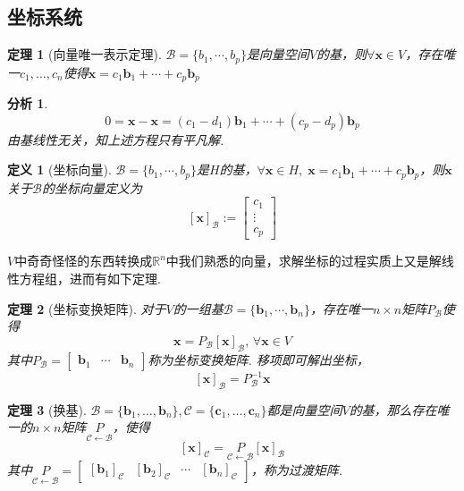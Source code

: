 \documentclass[11pt,UTF8]{ctexart}
\newtheorem{theorem}{定理}
\newtheorem{definition}{定义}
\newtheorem*{analysis}{分析}
\def\vx{\mathbf{x}}
\newcommand{\vb}[1]{\mathbf{#1}}
\newcommand{\bmat}[2]{\begin{bmatrix}{#1}&\cdots&{#2}\end{bmatrix}}
\begin{document}
\subsection{坐标系统}
\label{coordinate-system}
\begin{theorem}[向量唯一表示定理]
$\mathcal{B}=\{b_1,\cdots,b_p\}$是向量空间$V$的基，则$\forall\vx\in V$，存在唯一$c_1,\dots,c_n$使得$\vx=c_1\vb{b}_1+\cdots+c_p\vb{b}_p$
\end{theorem}
\begin{analysis}
\[0=\vx-\vx=(c_1-d_1)\vb{b}_1+\cdots+(c_p-d_p)\vb{b}_p\]
由基线性无关，知上述方程只有平凡解.
\end{analysis}
\begin{definition}[坐标向量]
$\mathcal{B}=\{b_1,\cdots,b_p\}$是$H$的基，$\forall\vx\in H,\;\vx=c_1\vb{b}_1+\cdots+c_p\vb{b}_p$，则$\vx$关于$\mathcal{B}$的坐标向量定义为
\[[\vx]_{\mathcal{B}}:=\begin{bmatrix}c_1\\ \vdots \\ c_p\end{bmatrix}\]
\end{definition}
$V$中奇奇怪怪的东西转换成$\mathbb{R}^n$中我们熟悉的向量，求解坐标的过程实质上又是解线性方程组，进而有如下定理.
\begin{theorem}[坐标变换矩阵]
对于$V$的一组基$\mathcal{B}=\{\vb{b}_1,\cdots,\vb{b}_n\}$，存在唯一$n\times n$矩阵$P_\mathcal{B}$使得
\[\mathbf{x}=P_\mathcal{B}[\mathbf{x}]_{\mathcal{B}},\,\forall \vx\in V\]
其中$P_\mathcal{B}=\bmat{\vb{b}_1}{\vb{b}_n}$称为坐标变换矩阵. 移项即可解出坐标，
\[[\mathbf{x}]_{\mathcal{B}}=P_\mathcal{B}^{-1} \mathbf{x}\]
\end{theorem}
\begin{theorem}[换基]
$\mathcal{B}=\{\vb{b}_1,\dots,\vb{b}_n\},\mathcal{C}=\{\vb{c}_1,\dots,\vb{c}_n\}$都是向量空间$V$的基，那么存在唯一的$n\times n$矩阵$\underset{\mathcal{C}\gets \mathcal{B}}{P}$，使得
\[[\vx]_{\mathcal{C}}=\underset{\mathcal{C}\gets \mathcal{B}}{P}[\vx]_{\mathcal{B}}\]
其中$\underset{\mathcal{C}\gets \mathcal{B}}{P}=\begin{bmatrix}[\vb{b}_1]_{\mathcal{C}}&[\vb{b}_2]_{\mathcal{C}}&\cdots&[\vb{b}_n]_{\mathcal{C}}\end{bmatrix}$，称为过渡矩阵.
\end{theorem}
\end{document}
